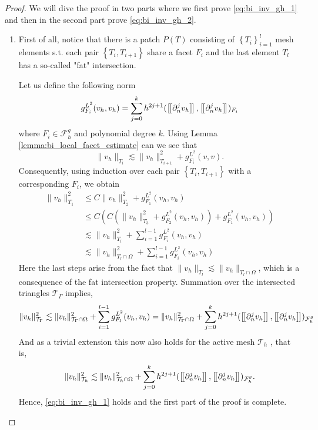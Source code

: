 \begin{proof}
    We will dive the proof in two parts where we first prove \eqref{eq:bi_inv_gh_1} and then in the second part prove \eqref{eq:bi_inv_gh_2}.
    \begin{enumerate}[label=\arabic*)]
        \item
            First of all, notice that there is a patch $P(T) $ consisting of $\left\{ T_{i} \right\}_{i=1}^{l} $ mesh elements s.t. each pair $ \left\{ T_{i}, T_{i+1} \right\} $ share a facet $F_{i}$ and the last element $T_{l}$ has a so-called "fat"
            intersection.

            Let us define the following norm \[
            g_{F_{i}}^{L^{2}}( v_{h},v_{h})  = \sum_{j=0}^{k} h^{2j+1}( \left[\!\left[  \partial ^{j}_{n}v_{h}  \right]\!\right], \left[\!\left[  \partial ^{j}_{n}v_{h}  \right]\!\right]    )_{F_{i} }
            \]
            where $F_{i} \in  \mathcal{F} ^{g}_{h}$ and polynomial degree $ k$. Using Lemma \ref{lemma:bi_local_facet_estimate} can we see that \[
            \| v_{h} \|_{ T_{i} }^{  } \lesssim \| v_{h} \|_{ T_{i+1} }^{ 2 } + g_{F_{i}}^{L^{2}}( v,v).
            \]
    Consequently, using induction over each pair $\left\{ T_{i}, T_{i+1} \right\} $ with a corresponding $F_{i}$, we obtain
            \[
                \begin{split}
            \| v_{h} \|_{ T_{1} }^{2  }  & \le  C \| v_{h} \|_{ T_{2} }^{ 2 } + g_{F_{1}}^{L^{2}}( v_{h},v_{h})\\
              & \le  C( C( \| v_{h} \|_{ T_{3} }^{ 2 } + g_{F_{2}}^{L^{2}}( v_{h},v_{h}) ) + g_{F_{1}}^{L^{2}}( v_{h},v_{h}) )\\
              & \lesssim    \| v_{h} \|_{ T_{l} }^{ 2 }  + \sum_{i=1}^{l-1} g_{F_{i}}^{L^{2}}( v_{h},v_{h})  \\
              & \lesssim    \| v_{h} \|_{ T_{l} \cap \Omega  }^{ 2 }  + \sum_{i=1}^{l-1} g_{F_{i}}^{L^{2}}( v_{h},v_{h})
                \end{split}
            \]
            Here the last steps arise from the fact that $\|  v_{h} \|_{ T_{l} }^{  } \lesssim  \|  v_{h} \|_{ T_{l} \cap \Omega  }^{  }  $, which is a consequence of the fat intersection property.
Summation over the intersected triangles $\mathcal{T} _{\Gamma }$ implies,
            \[
                    \| v_{h} \|_{ \mathcal{T} _{\Gamma } }^{2  } \lesssim \| v_{h} \|_{ \mathcal{T} _{\Gamma}\cap \Omega  }^{2  }+ \sum_{i=1}^{l-1} g_{F_{l}}^{L^{2}}( v_{h},v_{h}) \\
                     = \| v_{h} \|_{ \mathcal{T}_{\Gamma } \cap \Omega   }^{ 2 }  + \sum_{j=0}^{k} h^{2j+1} ( \left[\!\left[  \partial ^{j}_{n} v_{h}  \right]\!\right], \left[\!\left[  \partial ^{j}_{n}v_{h}  \right]\!\right]    )_{\mathcal{F}_{h}^{g}}
        \]
        And as a trivial extension this now also holds for the active mesh $\mathcal{T} _{h}$ , that is, \[
                    \| v_{h} \|_{ \mathcal{T} _{h } }^{2  } \lesssim  \| v_{h} \|_{ \mathcal{T}_{h } \cap \Omega   }^{ 2 }  + \sum_{j=0}^{k} h^{2j+1} ( \left[\!\left[  \partial ^{j}_{n} v_{h}  \right]\!\right], \left[\!\left[  \partial ^{j}_{n}v_{h}  \right]\!\right]    )_{\mathcal{F}_{h}^{g}}.
        \]
        Hence, \eqref{eq:bi_inv_gh_1} holds and the first part of the proof is complete.


\end{enumerate}
\end{proof}
